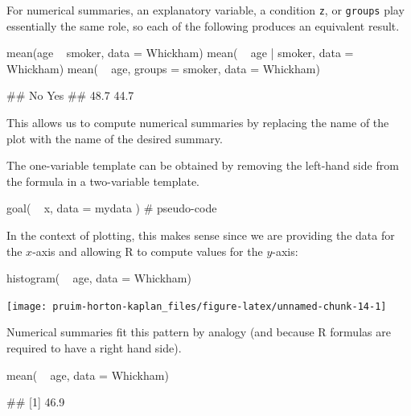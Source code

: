 For numerical summaries, an explanatory variable, a condition
\texttt{z}, or \texttt{groups} play essentially the same role, so each
of the following produces an equivalent result.

\begin{Schunk}
\begin{Sinput}
mean(age ~ smoker, data = Whickham)
mean( ~ age | smoker, data = Whickham)
mean( ~ age, groups = smoker, data = Whickham)
\end{Sinput}
\end{Schunk}\begin{Schunk}
\begin{Soutput}
##   No  Yes 
## 48.7 44.7
\end{Soutput}
\end{Schunk}

\noindent
This allows us to compute numerical summaries by replacing the name of
the plot with the name of the desired summary.

The one-variable template can be obtained by removing the left-hand side
from the formula in a two-variable template.

\begin{Schunk}
\begin{Sinput}
goal( ~ x, data = mydata )               # pseudo-code
\end{Sinput}
\end{Schunk}

\noindent
In the context of plotting, this makes sense since we are providing the
data for the \(x\)-axis and allowing R to compute values for the
\(y\)-axis:

\begin{Schunk}
\begin{Sinput}
histogram( ~ age, data = Whickham)
\end{Sinput}


\begin{center}\texttt{[image: pruim-horton-kaplan\_files/figure-latex/unnamed-chunk-14-1]} \end{center}

\end{Schunk}

\noindent
Numerical summaries fit this pattern by analogy (and because R formulas
are required to have a right hand side).

\begin{Schunk}
\begin{Sinput}
mean( ~ age, data = Whickham)
\end{Sinput}
\begin{Soutput}
## [1] 46.9
\end{Soutput}
\end{Schunk}

